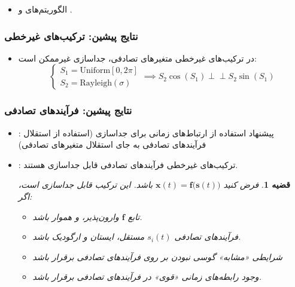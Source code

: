 \documentclass{beamer}
\makeatletter
\newcommand{ \RTList}{\raggedleft\rightskip\@totalleftmargin}
\newtheorem{thm}{{\large\bf قضیه}}[section]
\makeatother
\begin{document}
\begin{persian}
\begin{frame}
\begin{itemize}
\item
الگوریتم‌های 
و
.

\end{itemize}
\end{frame}

\begin{frame}
\frametitle{نتایج پیشین: ترکیب‌های غیرخطی}
\begin{itemize}\RTList
	\item
در ترکیب‌های غیرخطی متغیر‌های تصادفی، جداسازی غیرممکن است:
\begin{equation}
\begin{cases}
S_1 = \mathrm{Uniform} [0, 2\pi]\\
S_2 = \mathrm{Rayleigh}(\sigma)
\end{cases}
\implies
S_2 \cos (S_1) \perp \!\!\! \perp  S_2 \sin (S_1)
\end{equation}

\end{itemize}
\end{frame}


\begin{frame}
\frametitle{نتایج پیشین: فرآیند‌های تصادفی}
\begin{itemize}\RTList
	\item
		\lr{[Harmeling et al., 2003]}:
پیشنهاد استفاده از ارتباط‌های زمانی برای جداسازی (استفاده از استقلال فرآیند‌های تصادفی به جای استقلال متغیر‌های تصادفی)
	
	\item
	\lr{[Hyvarinen et al, 2017]}:
ترکیب‌های غیرخطی فرآیند‌های تصادفی قابل جداسازی هستند.
\begin{thm}
	 فرض کنید 
	 $\textbf{x}(t) = \textbf{f}\big(\textbf{s}(t)\big)$
	 باشد. این ترکیب قابل جداسازی است، اگر:
	 \begin{itemize}
	 	\item
	 	تابع 
	 	$\textbf{f}$
	 	وارون‌پذیر، و هموار باشد.
	 	\item
	 	فرآیند‌های تصادفی 
	 	$s_i(t)$
	 	مستقل، ایستان و ارگودیک باشد.
	 	\item
	 	شرایطی «مشابه» گوسی نبودن بر روی فرآیند‌های تصادفی برقرار باشد
	 	\item
           وجود رابطه‌های زمانی «قوی» در فرآیند‌های تصادفی برقرار باشد.
           
	 \end{itemize}

      \end{thm}
\end{itemize}
\end{frame}


\end{persian}
\end{document}
